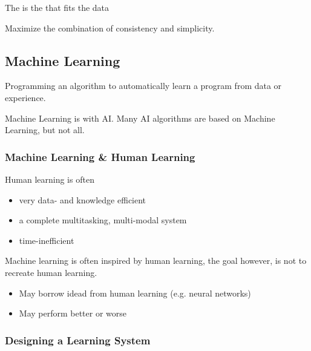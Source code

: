 \documentclass[
../../EiKI_Summary.tex,
]
{subfiles}
\begin{document}
\begin{minipage}
    [t]{0.5\textwidth}
    \begin{defbox}
        The  is the  that fits the data
    \end{defbox}
\end{minipage}
\begin{minipage}
    [t]{0.5\textwidth}
    \begin{defbox}
        Maximize the combination of consistency and simplicity.
    \end{defbox}
\end{minipage}

\subsection{Machine Learning}
Programming an algorithm to automatically learn a program from data or experience.

Machine Learning is  with AI. Many AI algorithms are based on Machine Learning, but not all. 

\subsubsection{Machine Learning \& Human Learning}
Human learning is often
\begin{itemize}
    \item very data- and knowledge efficient
    \item a complete multitasking, multi-modal system
    \item time-inefficient
\end{itemize}

Machine learning is often inspired by human learning, the goal however, is not to recreate human learning.
\begin{itemize}
    \item May borrow idead from human learning (e.g. neural networks)
    \item May perform better or worse
\end{itemize}

\subsubsection{Designing a Learning System}
\end{document}
